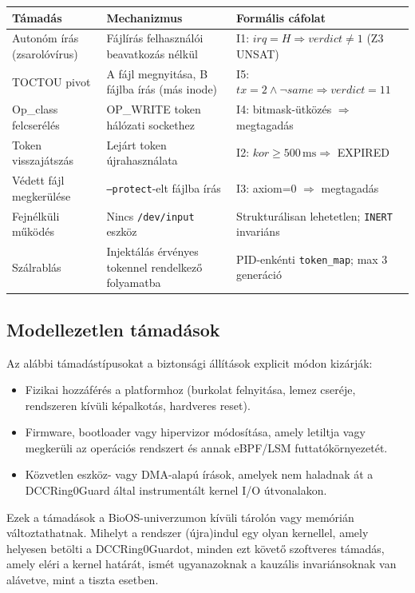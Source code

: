 \documentclass[11pt,a4paper,twoside]{article}
\begin{document}
\begin{longtable}{@{}p{3.2cm}p{3.8cm}p{5.4cm}@{}}
\toprule
\textbf{Támadás} & \textbf{Mechanizmus} & \textbf{Formális cáfolat} \\
\midrule \endhead \bottomrule \endfoot
Autonóm írás (zsarolóvírus)
  & Fájlírás felhasználói beavatkozás nélkül
  & I1: $\mathit{irq}{=}H \Rightarrow \mathit{verdict}{\neq}1$ (Z3 UNSAT) \\[3pt]
TOCTOU pivot
  & A fájl megnyitása, B fájlba írás (más inode)
  & I5: $\mathit{tx}{=}2 \wedge \neg\mathit{same} \Rightarrow \mathit{verdict}{=}11$ \\[3pt]
Op\_class felcserélés
  & OP\_WRITE token hálózati sockethez
  & I4: bitmask-ütközés $\Rightarrow$ megtagadás \\[3pt]
Token visszajátszás
  & Lejárt token újrahasználata
  & I2: $\mathit{kor}{\geq}500\,\mathrm{ms} \Rightarrow$ EXPIRED \\[3pt]
Védett fájl megkerülése
  & \texttt{--protect}-elt fájlba írás
  & I3: axiom=0 $\Rightarrow$ megtagadás \\[3pt]
Fejnélküli működés
  & Nincs \texttt{/dev/input} eszköz
  & Strukturálisan lehetetlen; \texttt{INERT} invariáns \\[3pt]
Szálrablás
  & Injektálás érvényes tokennel rendelkező folyamatba
  & PID-enkénti \texttt{token\_map}; max 3 generáció \\
\end{longtable}

\subsection{Modellezetlen támadások}

Az alábbi támadástípusokat a biztonsági állítások explicit módon kizárják:
\begin{itemize}[topsep=2pt,itemsep=2pt]
  \item Fizikai hozzáférés a platformhoz (burkolat felnyitása, lemez cseréje,
        rendszeren kívüli képalkotás, hardveres reset).
  \item Firmware, bootloader vagy hipervizor módosítása, amely letiltja vagy
        megkerüli az operációs rendszert és annak eBPF/LSM futtatókörnyezetét.
  \item Közvetlen eszköz- vagy DMA-alapú írások, amelyek nem haladnak át a
        DCCRing0Guard által instrumentált kernel I/O útvonalakon.
\end{itemize}
Ezek a támadások a BioOS-univerzumon kívüli tárolón vagy memórián változtathatnak.
Mihelyt a rendszer (újra)indul egy olyan kernellel, amely helyesen betölti a
DCCRing0Guardot, minden ezt követő szoftveres támadás, amely eléri a kernel határát,
ismét ugyanazoknak a kauzális invariánsoknak van alávetve, mint a tiszta esetben.
\end{document}
